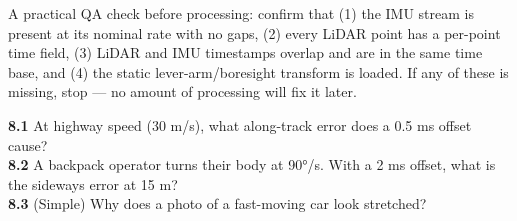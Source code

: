 \begin{tip}
A practical QA check before processing: confirm that (1) the IMU stream is present at its nominal rate with no gaps, (2) every LiDAR point has a per-point time field, (3) LiDAR and IMU timestamps overlap and are in the same time base, and (4) the static lever-arm/boresight transform is loaded. If any of these is missing, stop --- no amount of processing will fix it later.
\end{tip}

\begin{tryit}
\textbf{8.1} At highway speed (30 m/s), what along-track error does a 0.5 ms offset cause?\\
\textbf{8.2} A backpack operator turns their body at 90°/s. With a 2 ms offset, what is the sideways error at 15 m?\\
\textbf{8.3} (Simple) Why does a photo of a fast-moving car look stretched?
\end{tryit}

